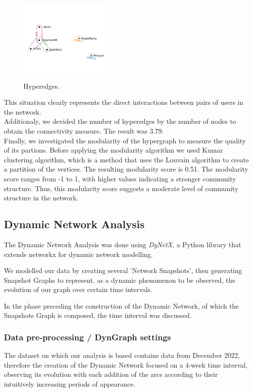 \documentclass[sigchi]{acmart}
\begin{document}
\begin{figure}[htbp]
  \centering
  \includegraphics[width=0.4\textwidth]{hyperedges.png}
  \caption{Hyperedges.}
  \label{fig:hypegrafi1}
\end{figure}


This situation clearly represents the direct interactions between pairs of users in the network.  \\
Additionaly, we devided the number of hyperedges by the number of nodes to obtain the connectivity measure. The result was 3.79. \\
Finally, we investigated the modularity of the hypergraph to measure the quality of its partions. 
Before applying the modularity algorithm we used Kumar clustering algorithm, which is a method that uses the Louvain algorithm to create a partition of the vertices. The resulting modularity score is 0.51. The modularity score ranges from -1 to 1, with higher values indicating a stronger community structure. Thus, this modularity score suggests a moderate level of community structure in the network.



\subsection{Dynamic Network Analysis}
The Dynamic Network Analysis was done using \textit{DyNetX}\cite{DynetX}, a Python library that extends networkx for dynamic network modelling. 

\noindent We modelled our data by creating several 'Network Snapshots', then generating Snapshot Graphs to represent, as a dynamic phenomenon to be observed, the evolution of our graph over certain time intervals.

\noindent In the phase preceding the construction of the Dynamic Network, of which the Snapshots Graph is composed, the time interval was discussed. 

\subsubsection{Data pre-processing / DynGraph settings} 
The dataset on which our analysis is based contains data from December 2022, 
therefore the creation of the Dynamic Network focused on a 4-week time interval, observing its evolution with each addition of the arcs according to their intuitively increasing periods of appearance. 
\end{document}
